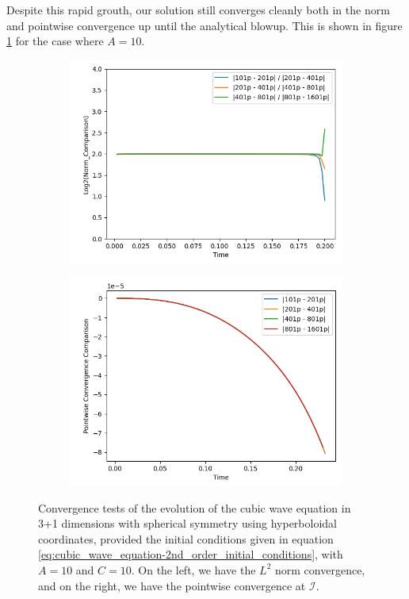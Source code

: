 Despite this rapid grouth, our solution still converges cleanly both in the norm and pointwise convergence up until the analytical blowup. This is shown in figure \ref{fig:cubic_wave_eq_convergence} for the case where $A = 10$. 

\begin{figure}[h]
    \centering
    \begin{subfigure}[b]{0.45\textwidth}
        \centering
        \includegraphics[width=\textwidth]{Images/Cubic_Wave_Equation_3+1_Spherical-A=10-Norm.png}
    \end{subfigure}
    \hfill
    \begin{subfigure}[b]{0.45\textwidth}
        \centering
        \includegraphics[width=\textwidth]{Images/Cubic_Wave_Equation_3+1_Spherical-A=10-Pointwise.png}
    \end{subfigure}
    \caption{Convergence tests of the evolution of the cubic wave equation in 3+1 dimensions with spherical symmetry using hyperboloidal coordinates, provided the initial conditions given in equation \eqref{eq:cubic_wave_equation-2nd_order_initial_conditions}, with $A=10$ and $C=10$. On the left, we have the $L^2$ norm convergence, and on the right, we have the pointwise convergence at $\mathscr{I}$.}
    \label{fig:cubic_wave_eq_convergence}
\end{figure}